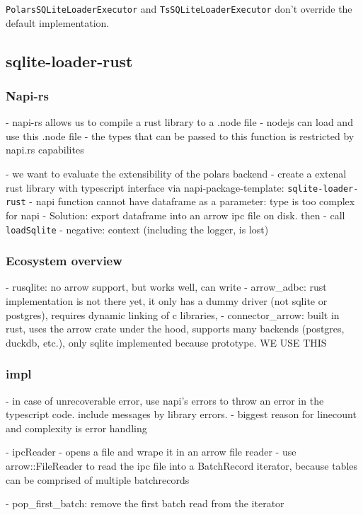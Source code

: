 \Verb|PolarsSQLiteLoaderExecutor| and \Verb|TsSQLiteLoaderExecutor| don't override the default implementation.

\subsection{sqlite-loader-rust}
\label{subsection:sqlite-loader-rust}

\subsubsection{Napi-rs}
- napi-rs allows us to compile a rust library to a .node file
- nodejs can load and use this .node file
- the types that can be passed to this function is restricted by napi.rs capabilites

- we want to evaluate the extensibility of the polars backend
- create a extenal rust library with typescript interface via napi-package-template: \Verb|sqlite-loader-rust|
- napi function cannot have dataframe as a parameter: type is too complex for napi
- Solution: export dataframe into an arrow ipc file on disk. then
- call \Verb|loadSqlite|
- negative: context (including the logger, is lost)

\subsubsection{Ecosystem overview}
- rusqlite: no arrow support, but works well, can write
- arrow\_adbc: rust implementation is not there yet, it only has a dummy driver (not sqlite or postgres), requires dynamic linking of c libraries,
- connector\_arrow: built in rust, uses the arrow crate under the hood, supports many backends (postgres, duckdb, etc.), only sqlite implemented because prototype. WE USE THIS

\subsubsection{impl}
- in case of unrecoverable error, use napi's errors to throw an error in the typescript code. include messages by library errors.
- biggest reason for linecount and complexity is error handling

- ipcReader
- opens a file and wrape it in an arrow file reader
- use arrow::FileReader to read the ipc file into a BatchRecord iterator, because tables can be comprised of multiple batchrecords

- pop_first_batch: remove the first batch read from the iterator

